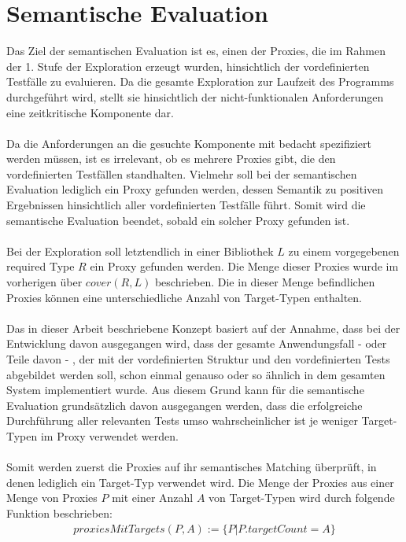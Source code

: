 \documentclass[a4paper,12pt]{article}
\begin{document}
\section{Semantische Evaluation}
Das Ziel der semantischen Evaluation ist es, einen der Proxies, die im Rahmen der 1. Stufe der Exploration erzeugt wurden, hinsichtlich der vordefinierten Testfälle zu evaluieren. Da die gesamte Exploration zur Laufzeit des Programms durchgeführt wird, stellt sie hinsichtlich der nicht-funktionalen Anforderungen eine zeitkritische Komponente dar.\\\\
Da die Anforderungen an die gesuchte Komponente mit bedacht spezifiziert werden müssen, ist es irrelevant, ob es mehrere Proxies gibt, die den vordefinierten Testfällen standhalten. Vielmehr soll bei der semantischen Evaluation lediglich ein Proxy gefunden werden, dessen Semantik zu positiven Ergebnissen hinsichtlich aller vordefinierten Testfälle führt. Somit wird die semantische Evaluation beendet, sobald ein solcher Proxy gefunden ist.\\\\
Bei der Exploration soll letztendlich in einer Bibliothek $L$ zu einem vorgegebenen required Type $R$ ein Proxy gefunden werden. Die Menge dieser Proxies wurde im vorherigen über $\mathit{cover(R,L)}$ beschrieben. Die in dieser Menge befindlichen Proxies können eine unterschiedliche Anzahl von Target-Typen enthalten.\\\\
Das in dieser Arbeit beschriebene Konzept basiert auf der Annahme, dass bei der Entwicklung davon ausgegangen wird, dass der gesamte Anwendungsfall - oder Teile davon - , der mit der vordefinierten Struktur und den vordefinierten Tests abgebildet werden soll, schon einmal genauso oder so ähnlich in dem gesamten System implementiert wurde. Aus diesem Grund kann für die semantische Evaluation grundsätzlich davon ausgegangen werden, dass die erfolgreiche Durchführung aller relevanten Tests umso wahrscheinlicher ist je weniger Target-Typen im Proxy verwendet werden.\\\\
Somit werden zuerst die Proxies auf ihr semantisches Matching überprüft, in denen lediglich ein Target-Typ verwendet wird. Die Menge der Proxies aus einer Menge von Proxies $P$ mit einer Anzahl $A$ von Target-Typen wird durch folgende Funktion beschrieben:
\begin{gather*}
proxiesMitTargets(P,A) := \{P | P.targetCount = A\}
\end{gather*}
\end{document}
